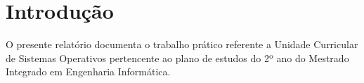 \chapter{Introdução}
\label{cap:intro}

O presente relatório documenta o trabalho prático referente a Unidade Curricular de Sistemas Operativos pertencente ao plano de estudos do 2º ano do Mestrado Integrado em Engenharia Informática.


